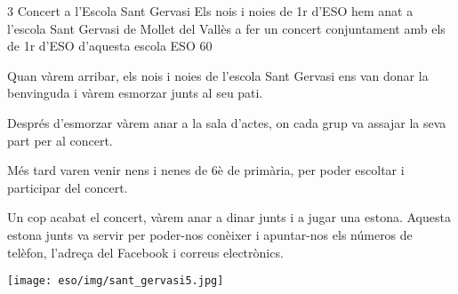 \begin{news}
{3} %
{Concert a l'Escola Sant Gervasi}
{Els nois i noies de 1r d’ESO hem anat a l’escola Sant Gervasi de Mollet del Vallès a fer un concert conjuntament amb els de 1r d’ESO d’aquesta escola}
{ESO}
{60} %


Quan vàrem arribar, els nois i noies de l’escola Sant Gervasi ens van donar la benvinguda i vàrem esmorzar junts al seu pati.

Després d’esmorzar vàrem anar a la sala d’actes, on cada grup va assajar la seva part per al concert.

Més tard varen venir nens i nenes de 6è de primària, per poder escoltar i participar del concert.

Un cop acabat el concert, vàrem anar a dinar junts i a jugar una estona. Aquesta estona junts va servir per poder-nos conèixer i apuntar-nos els números de telèfon, l’adreça del Facebook i correus electrònics.


\noindent\texttt{[image: eso/img/sant\_gervasi5.jpg]}


\end{news}
